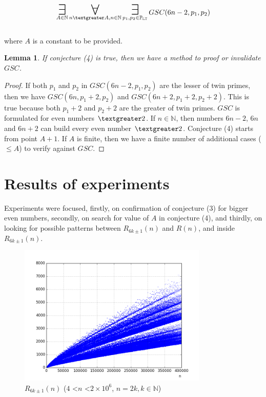\documentclass[10pt,twocolumn]{article}
\newtheorem{lemma}[theorem]{Lemma}
\newcommand\bigforall{\mbox{\huge $\mathsurround0pt\forall$}}
\newcommand\bigexists{\mbox{\huge $\mathsurround0pt\exists$}}
\begin{document}
\begin{equation}
\displaystyle\mathop{\bigexists}_{A \in \mathbb{N}}
\displaystyle\mathop{\bigforall}_{n \textgreater A, n \in \mathbb{N}}
\displaystyle\mathop{\bigexists}_{p_1, p_2 \in \mathbb{P_{LT}}}
GSC(6n-2, p_1, p_2)
\end{equation}
\\where 
$A$ is a constant to be provided. 

\begin{lemma}
If conjecture (4) is true, then we have a method to proof or invalidate $GSC$.
\end{lemma}
\begin{proof}
If both $p_1$ and $p_2$ in $GSC(6n-2, p_1, p_2)$ are the lesser of twin primes, then we have $GSC(6n, p_1+2, p_2)$ and $GSC(6n+2 , p_1+2, p_2+2)$. This is true because both $p_1+2$ and $p_2+2$ are the greater of twin primes. $GSC$ is formulated for even numbers $\textgreater 2$. If $n \in \mathbb{N}$, then numbers $6n-2$, $6n$ and $6n+2$ can build every even number $\textgreater 2$. Conjecture (4) starts from point $A+1$. If $A$ is finite, then we have a finite number of additional cases ($\leq A$) to verify against $GSC$.
\end{proof}

\section{Results of experiments}

Experiments were focused, firstly, on confirmation of conjecture (3) for bigger even numbers, secondly, on search for value of $A$ in conjecture (4), and thirdly, on looking for possible patterns between $R_{6k \pm 1}(n)$ and $R(n)$, and inside $R_{6k \pm 1}(n)$. \par

\begin{figure}[ht]
\centering
\captionsetup{justification=centering}
\includegraphics[width=9cm]{f_hypo_6kpm1}
\caption{ $R_{6k \pm 1}(n)$ ($4$ \textless $n$ \textless $2 \times 10^6$, $n = 2k, k \in \mathbb{N}$)}
\label{fig:6kmp1inpartitions}
\end{figure}
\end{document}

